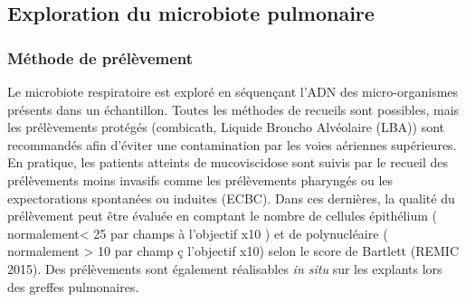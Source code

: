 \documentclass[12pt,a4paper]{article}
\begin{document}
\subsection{Exploration du microbiote pulmonaire}

\subsubsection{Méthode de prélèvement}
Le microbiote respiratoire est exploré en séquençant l'ADN des micro-organismes présents dans un échantillon. 
Toutes les méthodes de recueils sont possibles, mais les prélèvements protégés (combicath, Liquide Broncho Alvéolaire (LBA)) sont recommandés afin
d’éviter une contamination par les voies aériennes supérieures. En pratique, les patients atteints de mucoviscidose sont suivis par le recueil des prélèvements moins invasifs comme les prélèvements pharyngés ou les expectorations spontanées ou induites (ECBC). Dans ces dernières, la qualité du prélèvement peut être évaluée en comptant le nombre de cellules épithélium ( normalement< 25 par champs à l'objectif x10 ) et de polynucléaire ( normalement > 10 par champ ç l'objectif x10) selon le score de Bartlett (REMIC 2015). Des prélèvements sont également réalisables \textit{in situ}  sur les explants lors des greffes pulmonaires.
\end{document}
